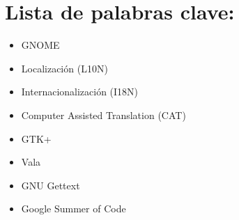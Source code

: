 %
%

\section*{Lista de palabras clave:}

\begin{itemize}
  \item GNOME
  \item Localización (L10N)
  \item Internacionalización (I18N)
  \item Computer Assisted Translation (CAT)
  \item GTK+
  \item Vala
  \item GNU Gettext
  \item Google Summer of Code
\end{itemize}
